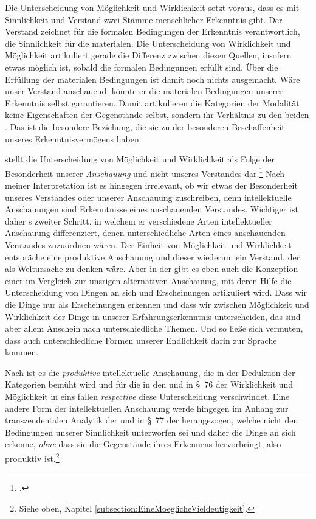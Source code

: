 Die Unterscheidung von Möglichkeit und Wirklichkeit setzt voraus, dass es mit
Sinnlichkeit und Verstand zwei Stämme menschlicher Erkenntnis gibt.
Der Verstand zeichnet für die formalen Bedingungen der Erkenntnis verantwortlich, die
Sinnlichkeit für die materialen. Die Unterscheidung von Wirklichkeit und
Möglichkeit artikuliert gerade die Differenz zwischen diesen Quellen, insofern
etwas möglich ist, sobald die formalen Bedingungen erfüllt sind. Über die
Erfüllung der materialen Bedingungen ist damit noch nichts ausgemacht. Wäre unser
Verstand anschauend, könnte er die materialen Bedingungen unserer Erkenntnis
selbst garantieren. Damit artikulieren die Kategorien der Modalität
keine Eigenschaften der Gegenstände selbst, sondern ihr Verhältnis zu den beiden
. Das ist die besondere Beziehung, die
sie zu der besonderen Beschaffenheit unseres Erkenntnisvermögens haben.

 stellt die Unterscheidung
von Möglichkeit und Wirklichkeit als Folge der Besonderheit unserer
\emph{Anschauung} und nicht unseres Verstandes
dar.\footnote{\cite[Vgl.][153]{Foerster:Die25JahrederPhilosophie2011}.} Nach
meiner Interpretation ist es hingegen irrelevant, ob wir etwas der Besonderheit
unseres Verstandes oder unserer Anschauung zuschreiben, denn intellektuelle
Anschauungen sind Erkenntnisse eines anschauenden Verstandes. Wichtiger
ist daher s zweiter Schritt,
in welchem er verschiedene Arten intellektueller Anschauung differenziert, denen
unterschiedliche Arten eines anschauenden Verstandes zuzuordnen wären.
Der Einheit von Möglichkeit und Wirklichkeit entspräche eine produktive
Anschauung und dieser wiederum ein Verstand, der als Weltursache zu denken wäre.
Aber in der  gibt es eben auch die Konzeption
einer im Vergleich zur unsrigen alternativen Anschauung, mit deren Hilfe die Unterscheidung von Dingen an sich
und Erscheinungen artikuliert wird. Dass wir die Dinge nur als Erscheinungen
erkennen und dass wir zwischen Möglichkeit und Wirklichkeit der Dinge in unserer
Erfahrungserkenntnis unterscheiden, das sind aber allem Anschein nach
unterschiedliche Themen. Und so ließe sich vermuten, dass auch
unterschiedliche Formen unserer Endlichkeit darin zur Sprache kommen.

Nach  ist es die
\emph{produktive} intellektuelle Anschauung, die in der Deduktion der Kategorien
bemüht wird und für die in den  und in \S~76 der  Wirklichkeit und
Möglichkeit in eins fallen \emph{respective} diese Unterscheidung verschwindet.
Eine andere Form der intellektuellen Anschauung werde hingegen im Anhang zur
transzendentalen Analytik der  und in \S~77
der  herangezogen, welche nicht den Bedingungen
unserer Sinnlichkeit unterworfen sei und daher die Dinge an sich
erkenne, \emph{ohne} dass sie die Gegenstände ihres Erkennens
hervorbringt, also produktiv ist.\footnote{Siehe oben, Kapitel
\ref{subsection:EineMoeglicheVieldeutigkeit}.}

